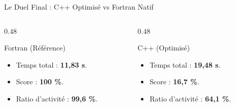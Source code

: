 \begin{frame}{Le Duel Final : C++ Optimisé vs Fortran Natif}
    \centering
    
    \vspace{-0.5cm}
    \begin{columns}[T]
        \begin{column}{0.48\textwidth}
            \begin{exampleblock}{\footnotesize Fortran (Référence)}
                \fontsize{7}{8}\selectfont
                \begin{itemize}
                    \item Temps total : \textbf{11,83 s}.
                    \item Score : \textbf{100 \%}.
                    \item Ratio d'activité : \textbf{99,6 \%}.
                \end{itemize}
            \end{exampleblock}
        \end{column}
        \begin{column}{0.48\textwidth}
            \begin{alertblock}{\footnotesize C++ (Optimisé)}
                \fontsize{7}{8}\selectfont
                \begin{itemize}
                    \item Temps total : \textbf{19,48 s}.
                    \item Score : \textbf{16,7 \%}.
                    \item Ratio d'activité : \textbf{64,1 \%}.
                \end{itemize}
            \end{alertblock}
        \end{column}
    \end{columns}
\end{frame}

